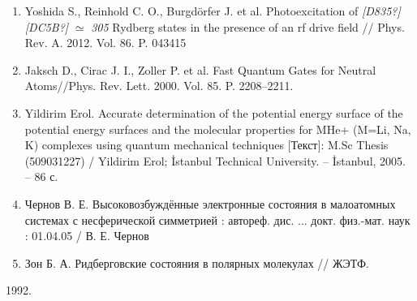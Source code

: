 \documentclass[a4paper]{article}
\newcounter{saveenum}
\newcommand\liststyleWWNumi{%
\renewcommand\theenumi{\arabic{enumi}}
\renewcommand\theenumii{\Roman{enumii}}
\renewcommand\theenumiii{\roman{enumiii}}
\renewcommand\theenumiv{\arabic{enumiv}}
\renewcommand\labelenumi{\theenumi.}
\renewcommand\labelenumii{\theenumii.}
\renewcommand\labelenumiii{\theenumiii.}
\renewcommand\labelenumiv{\theenumiv.}
}
\begin{document}
\liststyleWWNumi
\setcounter{saveenum}{\value{enumi}}
\begin{enumerate}
\setcounter{enumi}{\value{saveenum}}
\item \foreignlanguage{english}{Yoshida S., Reinhold C. O., Burgd\"orfer J. et al. Photoexcitation of }\newline
\foreignlanguage{english}{\textit{[D835?][DC5B?]}}\foreignlanguage{english}{
}\foreignlanguage{english}{\textit{${\simeq}$}}\foreignlanguage{english}{
}\foreignlanguage{english}{\textit{305}}\foreignlanguage{english}{ Rydberg states in the presence of an rf drive field
// Phys. Rev. A. 2012. Vol. 86. P. 043415}
\item \foreignlanguage{english}{Jaksch D., Cirac J. I., Zoller P. et al. Fast Quantum Gates for Neutral Atoms//Phys.
Rev. Lett. 2000. Vol. 85. P. 2208--2211.}
\item \foreignlanguage{english}{Yildirim Erol. Accurate determination of the potential energy surface of the potential
energy surfaces and the molecular properties for MHe+ (M=Li, Na, K) complexes using quantum mechanical techniques
[}Текст\foreignlanguage{english}{]: M.Sc Thesis (509031227) / Yildirim Erol; \.Istanbul
Technical University. -- \.Istanbul, 2005. -- 86 }с\foreignlanguage{english}{.}
\item Чернов В. Е.
Высоковозбуждённые электронные состояния в малоатомных системах с несферической симметрией : автореф. дис. ... докт.
физ.-мат. наук : 01.04.05 / В. Е.
Чернов
\item Зон Б. А.
Ридберговские состояния в полярных
молекулах // ЖЭТФ.
\end{enumerate}
\foreignlanguage{english}{1992. }
\end{document}
